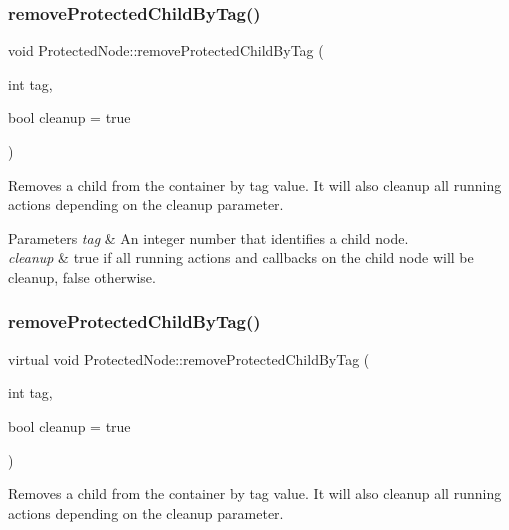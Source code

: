 \subsubsection{\texorpdfstring{remove\+Protected\+Child\+By\+Tag()}{removeProtectedChildByTag()}\hspace{0.1cm}{\footnotesize\ttfamily [1/2]}}
{\footnotesize\ttfamily void Protected\+Node\+::remove\+Protected\+Child\+By\+Tag (\begin{DoxyParamCaption}\item[{int}]{tag,  }\item[{bool}]{cleanup = {\ttfamily true} }\end{DoxyParamCaption})\hspace{0.3cm}{\ttfamily [virtual]}}

Removes a child from the container by tag value. It will also cleanup all running actions depending on the cleanup parameter.


\begin{DoxyParams}{Parameters}
{\em tag} & An integer number that identifies a child node. \\
\hline
{\em cleanup} & true if all running actions and callbacks on the child node will be cleanup, false otherwise. \\
\hline
\end{DoxyParams}
\mbox{\label{classProtectedNode_a72d22821af23262abe3da2c8fb1d47a2}} 
\subsubsection{\texorpdfstring{remove\+Protected\+Child\+By\+Tag()}{removeProtectedChildByTag()}\hspace{0.1cm}{\footnotesize\ttfamily [2/2]}}
{\footnotesize\ttfamily virtual void Protected\+Node\+::remove\+Protected\+Child\+By\+Tag (\begin{DoxyParamCaption}\item[{int}]{tag,  }\item[{bool}]{cleanup = {\ttfamily true} }\end{DoxyParamCaption})\hspace{0.3cm}{\ttfamily [virtual]}}

Removes a child from the container by tag value. It will also cleanup all running actions depending on the cleanup parameter.


